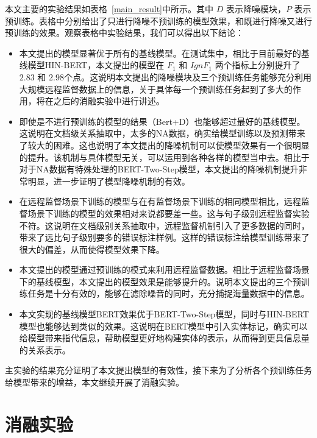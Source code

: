 本文主要的实验结果如表格~\ref{main_result}中所示。其中 $D$ 表示降噪模块，$P$ 表示预训练。表格中分别给出了只进行降噪不预训练的模型效果，和既进行降噪又进行预训练的效果。观察表格中实验结果，我们可以得出以下结论：
\begin{itemize}
	\item 本文提出的模型显著优于所有的基线模型。在测试集中，相比于目前最好的基线模型HIN-BERT，本文提出的模型在 $F_1$ 和 $IgnF_1$ 两个指标上分别提升了 $2.83$ 和 $2.98$个点。这说明本文提出的降噪模块及三个预训练任务能够充分利用大规模远程监督数据上的信息，关于具体每一个预训练任务起到了多大的作用，将在之后的消融实验中进行讲述。
	\item 即使是不进行预训练的模型的结果（Bert+D）也能够超过最好的基线模型。这说明在文档级关系抽取中，太多的NA数据，确实给模型训练以及预测带来了较大的困难。这也说明了本文提出的降噪机制可以使模型效果有一个很明显的提升。该机制与具体模型无关，可以运用到各种各样的模型当中去。相比于对于NA数据有特殊处理的BERT-Two-Step模型，本文提出的降噪机制提升非常明显，进一步证明了模型降噪机制的有效。
	\item 在远程监督场景下训练的模型与在有监督场景下训练的相同模型相比，远程监督场景下训练的模型的效果相对来说都要差一些。这与句子级别远程监督实验不符。这说明在文档级别关系抽取中，远程监督机制引入了更多数据的同时，带来了远比句子级别要多的错误标注样例。这样的错误标注给模型训练带来了很大的偏差，从而使得模型效果下降。
	\item 本文提出的模型通过预训练的模式来利用远程监督数据。相比于远程监督场景下的基线模型，本文提出的模型效果是能够提升的。说明本文提出的三个预训练任务是十分有效的，能够在滤除噪音的同时，充分捕捉海量数据中的信息。
	\item 本文实现的基线模型BERT效果优于BERT-Two-Step模型，同时与HIN-BERT模型也能够达到类似的效果。这说明在BERT模型中引入实体标记，确实可以给模型带来指代信息，帮助模型更好地构建实体的表示，从而得到更具信息量的关系表示。
\end{itemize}

主实验的结果充分证明了本文提出模型的有效性，接下来为了分析各个预训练任务给模型带来的增益，本文继续开展了消融实验。


\section{消融实验}


